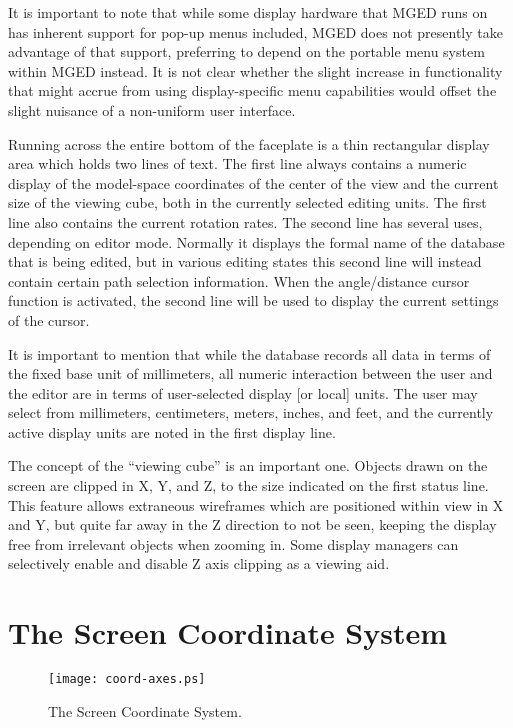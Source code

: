 It is important to note that while some display hardware that MGED runs on
has inherent support for pop-up menus included, MGED does not
presently take advantage of that support, preferring to depend
on the portable menu system within MGED instead.
It is not clear whether the slight increase in functionality that might
accrue from using display-specific menu capabilities would offset the
slight nuisance of a non-uniform user interface.

Running across the entire bottom of the faceplate is a thin rectangular
display area which holds two lines of text.
The first line always contains a numeric display of the model-space
coordinates of the center of the view and the current size of
the viewing cube, both in the currently selected editing units.
The first line also contains the current rotation rates.
The second line has several uses, depending on editor mode.
Normally it displays the formal name of the database that is being
edited, but in various editing states this second line will instead
contain certain path selection information.
When the angle/distance cursor function is activated, the second
line will be used to display the current settings of the cursor.

It is important to mention that while the database records all
data in terms of the fixed base unit of millimeters, all numeric interaction between
the user and the editor are in terms of user-selected display [or local] units.
The user may select from millimeters, centimeters, meters, inches, and
feet, and the currently active display units are noted in the first
display line.

The concept of the ``viewing cube'' is an important one.
Objects drawn on the screen are clipped in X, Y, and Z, to the size
indicated on the first status line.
This feature allows extraneous wireframes which are positioned within view
in X and Y, but quite far away in the Z direction to not be seen,
keeping the display free from irrelevant objects when zooming in.
Some display managers can selectively enable and disable Z axis clipping
as a viewing aid.

\section{The Screen Coordinate System}

\begin{figure}
\centering \texttt{[image: coord-axes.ps]}
\caption{The Screen Coordinate System.}
\label{coord-axes}
\end{figure}

